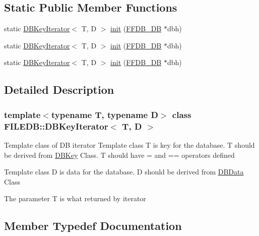 \subsection*{Static Public Member Functions}
\begin{DoxyCompactItemize}
\item 
static \mbox{\hyperlink{classFILEDB_1_1DBKeyIterator}{D\+B\+Key\+Iterator}}$<$ T, D $>$ \mbox{\hyperlink{classFILEDB_1_1DBKeyIterator_af4a5e1eaeb6e5c491c5894f3e70f893c}{init}} (\mbox{\hyperlink{adat-devel_2other__libs_2filedb_2filehash_2ffdb__db_8h_a0b27b956926453a7a8141ea8e10f0df8}{F\+F\+D\+B\+\_\+\+DB}} $\ast$dbh)
\item 
static \mbox{\hyperlink{classFILEDB_1_1DBKeyIterator}{D\+B\+Key\+Iterator}}$<$ T, D $>$ \mbox{\hyperlink{classFILEDB_1_1DBKeyIterator_af4a5e1eaeb6e5c491c5894f3e70f893c}{init}} (\mbox{\hyperlink{adat-devel_2other__libs_2filedb_2filehash_2ffdb__db_8h_a0b27b956926453a7a8141ea8e10f0df8}{F\+F\+D\+B\+\_\+\+DB}} $\ast$dbh)
\item 
static \mbox{\hyperlink{classFILEDB_1_1DBKeyIterator}{D\+B\+Key\+Iterator}}$<$ T, D $>$ \mbox{\hyperlink{classFILEDB_1_1DBKeyIterator_af4a5e1eaeb6e5c491c5894f3e70f893c}{init}} (\mbox{\hyperlink{adat-devel_2other__libs_2filedb_2filehash_2ffdb__db_8h_a0b27b956926453a7a8141ea8e10f0df8}{F\+F\+D\+B\+\_\+\+DB}} $\ast$dbh)
\end{DoxyCompactItemize}


\subsection{Detailed Description}
\subsubsection*{template$<$typename T, typename D$>$\newline
class F\+I\+L\+E\+D\+B\+::\+D\+B\+Key\+Iterator$<$ T, D $>$}

Template class of DB iterator Template class T is key for the database. T should be derived from \mbox{\hyperlink{classFILEDB_1_1DBKey}{D\+B\+Key}} Class. T should have = and == operators defined

Template class D is data for the database. D should be derived from \mbox{\hyperlink{classFILEDB_1_1DBData}{D\+B\+Data}} Class

The parameter T is what returned by iterator 

\subsection{Member Typedef Documentation}
\mbox{\label{classFILEDB_1_1DBKeyIterator_aaf7773c7a848ec6e04bc738dd794ace1}} 
